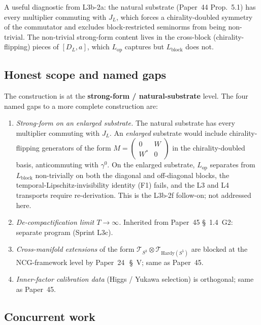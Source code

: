 \documentclass[11pt,a4paper]{article}
\theoremstyle{plain}
\theoremstyle{definition}
\newcommand{\sthree}{S^{3}}
\newcommand{\Tcal}{\mathcal{T}}
\newcommand{\DL}{D_{L}}
\newcommand{\JL}{J_{L}}
\newcommand{\Lop}{L_{\mathrm{op}}}
\newcommand{\Lblock}{L_{\mathrm{block}}}
\begin{document}
A useful diagnostic from L3b-2a: the natural substrate (Paper~44
Prop.~5.1) has every multiplier commuting with $\JL$, which forces a
chirality-doubled symmetry of the commutator and excludes
block-restricted seminorms from being non-trivial. The non-trivial
strong-form content lives in the cross-block (chirality-flipping)
pieces of $[\DL, a]$, which $\Lop$ captures but $\Lblock$ does not.

\subsection{Honest scope and named gaps}\label{sec:scope_intro}

The construction is at the \textbf{strong-form / natural-substrate}
level. The four named gaps to a more complete construction are:
\begin{enumerate}
\item[(G1$'$)] \emph{Strong-form on an enlarged substrate.} The natural
substrate has every multiplier commuting with $\JL$. An
\emph{enlarged} substrate would include chirality-flipping
generators of the form $M = \begin{pmatrix}0 & W \\ W^{*} & 0\end{pmatrix}$
in the chirality-doubled basis, anticommuting with $\gamma^{0}$. On
the enlarged substrate, $\Lop$ separates from $\Lblock$ non-trivially
on both the diagonal and off-diagonal blocks, the temporal-Lipschitz-invisibility
identity (F1) fails, and the L3 and L4 transports require re-derivation.
This is the L3b-2f follow-on; not addressed here.
\item[(G2)] \emph{De-compactification limit $T \to \infty$.} Inherited
from Paper~45 \S~1.4~G2: separate program (Sprint L3c).
\item[(G3)] \emph{Cross-manifold extensions} of the form
$\Tcal_{\sthree} \otimes \Tcal_{\mathrm{Hardy}(S^{5})}$ are blocked at
the NCG-framework level by Paper~24~\cite{paper24}\,\S~V; same as
Paper~45.
\item[(G4)] \emph{Inner-factor calibration data} (Higgs / Yukawa
selection) is orthogonal; same as Paper~45.
\end{enumerate}

\subsection{Concurrent work}\label{sec:concurrent_work}
\end{document}
